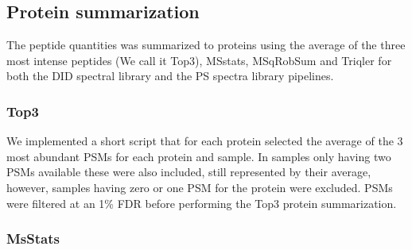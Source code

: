\documentclass[10pt,letterpaper]{article}
\begin{document}




\subsection*{Protein summarization}

The peptide quantities was summarized to proteins using the average of the three most intense peptides (We call it Top3), MSstats, MSqRobSum and Triqler for both the DID spectral library and the PS spectra library pipelines. 

\subsubsection*{Top3}

We implemented a short script that for each protein selected the average of the 3 most abundant PSMs for each protein and sample. In samples only having two PSMs available these were also included, still represented by their average, however, samples having zero or one PSM for the protein were excluded. PSMs were filtered at an 1\% FDR before performing the Top3 protein summarization. 




\subsubsection*{MsStats}
\end{document}
